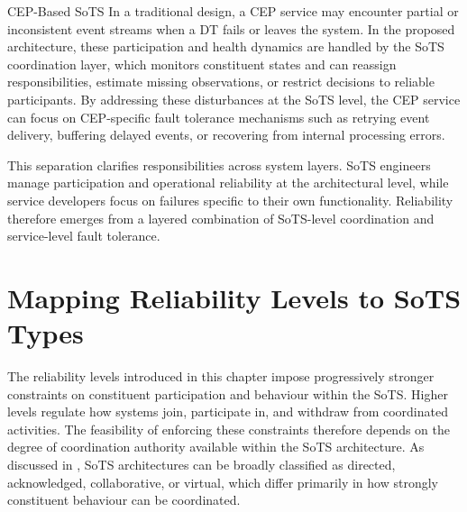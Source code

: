 \begin{runningexample}{CEP-Based SoTS}
In a traditional design, a CEP service may encounter partial or inconsistent event streams when a DT fails or leaves the system. In the proposed architecture, these participation and health dynamics are handled by the SoTS coordination layer, which monitors constituent states and can reassign responsibilities, estimate missing observations, or restrict decisions to reliable participants. By addressing these disturbances at the SoTS level, the CEP service can focus on CEP-specific fault tolerance mechanisms such as retrying event delivery, buffering delayed events, or recovering from internal processing errors.
\end{runningexample}

This separation clarifies responsibilities across system layers. SoTS engineers manage participation and operational reliability at the architectural level, while service developers focus on failures specific to their own functionality. Reliability therefore emerges from a layered combination of SoTS-level coordination and service-level fault tolerance.



\section{Mapping Reliability Levels to SoTS Types}\label{sec:reliability-compatibility}


The reliability levels introduced in this chapter impose progressively stronger constraints on constituent participation and behaviour within the SoTS. Higher levels regulate how systems join, participate in, and withdraw from coordinated activities. The feasibility of enforcing these constraints therefore depends on the degree of coordination authority available within the SoTS architecture. As discussed in , SoTS architectures can be broadly classified as directed, acknowledged, collaborative, or virtual, which differ primarily in how strongly constituent behaviour can be coordinated.

